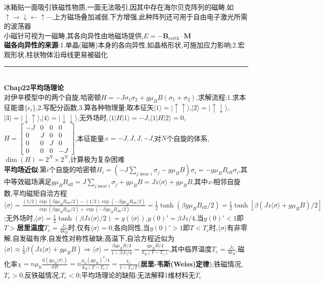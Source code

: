 \documentclass[UTF8,10pt,a4paper]{article}
\begin{document}
\begin{multicols}{2}
冰箱贴一面吸引铁磁性物质,一面无法吸引,因其中存在海尔贝克阵列的磁畴,如$\uparrow\rightarrow\downarrow\leftarrow\uparrow\cdots$,上方磁场叠加减弱,下方增强,此种阵列还可用于自由电子激光所需的波荡器\\
小磁针可视为一磁畴,其各向异性由地磁场提供,$E=-\bm{B}_{\text{earth}}\cdot\bm{M}$\\
\textbf{磁各向异性的来源}:1.单晶(磁畴)本身的各向异性,如晶格形状,可施加应力影响;2.宏观形状,柱状物体沿母线更易被磁化\\
\rule{\columnwidth}{.2pt}\\
\textbf{Chap22平均场理论}\\
对伊辛模型中的两个自旋,哈密顿$H=-J\sigma_1\sigma_2+g\mu_BB(\sigma_1+\sigma_2)$,求解流程:1.求本征能谱$\{\epsilon_i\}$,2.写配分函数,3.算各种物理量;取本征矢$\lvert 1\rangle=\lvert\uparrow\uparrow\rangle$,$\lvert 2\rangle=\lvert\uparrow\downarrow\rangle$,$\lvert 3\rangle=\lvert\downarrow\uparrow\rangle$,$\lvert 4\rangle=\lvert\downarrow\downarrow\rangle$,无外场时,$\langle 1\rvert H\lvert 1\rangle=-J$,$\langle 1\rvert H\lvert 2\rangle=0$,$H=\left[\begin{smallmatrix}
    -J&0&0&0\\
    0&J&0&0\\
    0&0&J&0\\
    0&0&0&-J
\end{smallmatrix}\right]$,本征能量:$\epsilon=-J,J,J,-J$,对$N$个自旋的体系,$\dim(H)=2^N\times 2^N$,计算极为复杂困难\\
\textbf{平均场近似}:第$i$个自旋的哈密顿$H_i=(-J\sum_{j\text{ near }i}\sigma_j-g\mu_BB)\sigma_i=-g\mu_BB_{\text{eff}}\sigma_i$,其中等效磁场满足$g\mu_BB_{\text{eff}}=J\sum_{j\text{ near i}}\sigma_j+g\mu_BB=Jz\langle\sigma\rangle+g\mu_BB$,其中$z$-相邻自旋数,平均磁矩自洽方程$\langle\sigma\rangle=\frac{(1/2)\exp(\beta g\mu_BB_{\text{eff}}/2)-(1/2)\exp(-\beta g\mu_BB_{\text{eff}}/2)}{\exp(\beta g\mu_BB_{\text{eff}}/2)+\exp(-\beta g\mu_BB_{\text{eff}}/2)}=\frac{1}{2}\tanh(\beta g\mu_BB_{\text{eff}}/2)=\frac{1}{2}\tanh[\beta(Jz\langle\sigma\rangle+g\mu_BB)/2]$;无外场时,$\langle\sigma\rangle=\frac{1}{2}\tanh(\beta Jz\langle\sigma\rangle/2)=y(\langle\sigma\rangle)$,$y(0)'=\beta Jz/4$,当$y(0)'<1$即$T>$\textbf{居里温度}$T_c=\frac{Jz}{4k_B}$时,仅有$\langle\sigma\rangle=0$,各向同性,当$y(0)'>1$即$T<T_c$时,$\langle\sigma\rangle$有非零解,自发磁有序,自发性对称性破缺;高温下,自洽方程近似为$\langle\sigma\rangle\approx\frac{1}{4}\beta(Jz\langle\sigma\rangle+g\mu_BB)\Rightarrow\langle\sigma\rangle=\frac{\beta g\mu_BB/4}{1-\beta Jz/4}=\frac{g\mu_BB/4}{k_B(T-T_c)}$,其中临界温度$T_c=\frac{Jz}{4k_B}$,磁化率$\chi=n\mu_0\frac{\mathrm{d}(g\mu_B\langle\sigma\rangle)}{\mathrm{d}B}=n\frac{\mu_0(g\mu_B)^2/4}{k_B(T-T_c)}=\frac{\chi_c}{1-T_c/T}$(\textbf{居里-韦斯(Weiss)定律});铁磁情况,$T_c>0$,反铁磁情况,$T_c<0$;平均场理论的缺陷:无法解释1维材料无$T_c$\\

\end{multicols}
\end{document}
